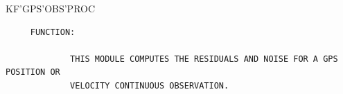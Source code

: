 \begin{frame}
KF'GPS'OBS'PROC
\begin{verbatim}
     FUNCTION:

             THIS MODULE COMPUTES THE RESIDUALS AND NOISE FOR A GPS POSITION OR
             VELOCITY CONTINUOUS OBSERVATION.

\end{verbatim}
\end{frame}
